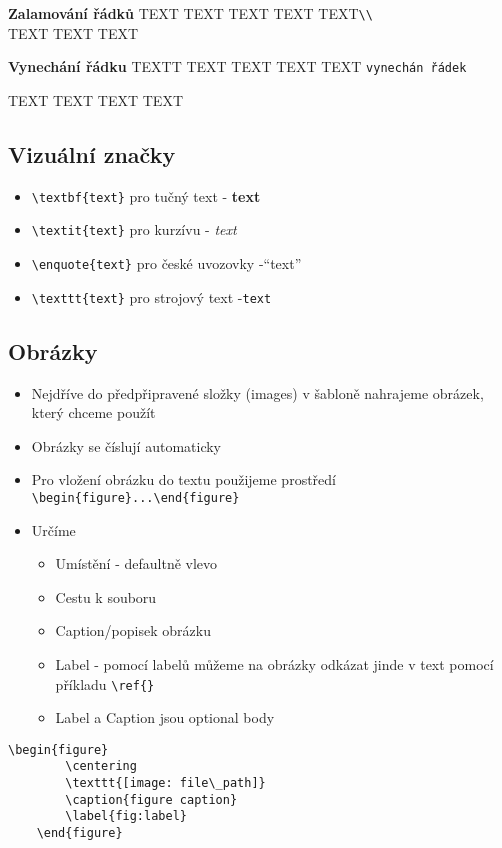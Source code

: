     \textbf{Zalamování řádků}
    TEXT TEXT TEXT TEXT TEXT\verb|\\|\\ TEXT TEXT TEXT
    
    \textbf{Vynechání řádku}
    TEXTT TEXT TEXT TEXT TEXT \verb|vynechán řádek|
    
    TEXT TEXT TEXT TEXT
\subsection{Vizuální značky}
\begin{itemize}
    \item \verb|\textbf{text}| pro tučný text - \textbf{text}
    \item \verb|\textit{text}| pro kurzívu - \textit{text}
    \item \verb|\enquote{text}| pro české uvozovky -\enquote{text}
    \item \verb|\texttt{text}| pro strojový text -\texttt{text}

\end{itemize}

\subsection{Obrázky}
\begin{itemize}
    \item Nejdříve do předpřipravené složky (images) v šabloně nahrajeme obrázek, který chceme použít
    \item Obrázky se číslují automaticky
    \item Pro vložení obrázku do textu použijeme prostředí \verb|\begin{figure}...\end{figure}|
    
    \item Určíme\begin{itemize}
        \item Umístění - defaultně vlevo
        \item Cestu k souboru
        \item Caption/popisek obrázku
        \item Label - pomocí labelů můžeme na obrázky odkázat jinde v text pomocí příkladu \verb|\ref{}|
        \item Label a Caption jsou optional body
    \end{itemize}
\end{itemize}
\begin{lstlisting}[frame = single]
    \begin{figure}
        \centering 
        \texttt{[image: file\_path]} 
        \caption{figure caption}
        \label{fig:label}
    \end{figure}
\end{lstlisting}


